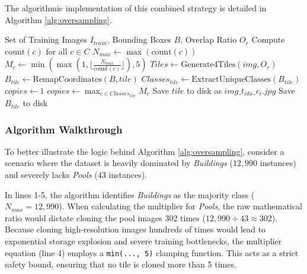 The algorithmic implementation of this combined strategy is detailed in Algorithm \ref{alg:oversampling}.

\begin{algorithm}[h]
\caption{Offline Tiling and Targeted Oversampling Pipeline}
\label{alg:oversampling}
\begin{algorithmic}[1]
\Require Set of Training Images $I_{train}$, Bounding Boxes $B$, Overlap Ratio $O_r$
\State Compute $\text{count}(c)$ for all $c \in C$ 
\State $N_{max} \gets \max(\text{count}(c))$ 
    \State $M_c \gets \min\left( \max\left(1, \lfloor \frac{N_{max}}{\text{count}(c)} \rfloor \right), 5 \right)$ 
\EndFor
{}
    \State $Tiles \gets \text{Generate4Tiles}(img, O_r)$ 
        \State $B_{tile} \gets \text{RemapCoordinates}(B, tile)$ 
        \State $Classes_{tile} \gets \text{ExtractUniqueClasses}(B_{tile})$ 
        \State $copies \gets 1$ 
            \State $copies \gets \max_{c \in Classes_{tile}} M_c$ 
        \EndIf
            \State Save $tile$ to disk as $img\_t_{idx}\_c_{i}.jpg$ 
            \State Save $B_{tile}$ to disk 
        \EndFor
    \EndFor
\EndFor
\end{algorithmic}
\end{algorithm}

\subsubsection*{Algorithm Walkthrough}
To better illustrate the logic behind Algorithm \ref{alg:oversampling}, consider a scenario where the dataset is heavily dominated by \textit{Buildings} ($12,990$ instances) and severely lacks \textit{Pools} ($43$ instances). 

In lines 1-5, the algorithm identifies \textit{Buildings} as the majority class ($N_{max} = 12,990$). When calculating the multiplier for \textit{Pools}, the raw mathematical ratio would dictate cloning the pool images 302 times ($12,990 \div 43 \approx 302$). Because cloning high-resolution images hundreds of times would lead to exponential storage explosion and severe training bottlenecks, the multiplier equation (line 4) employs a \texttt{min(..., 5)} clamping function. This acts as a strict safety bound, ensuring that no tile is cloned more than 5 times. 

